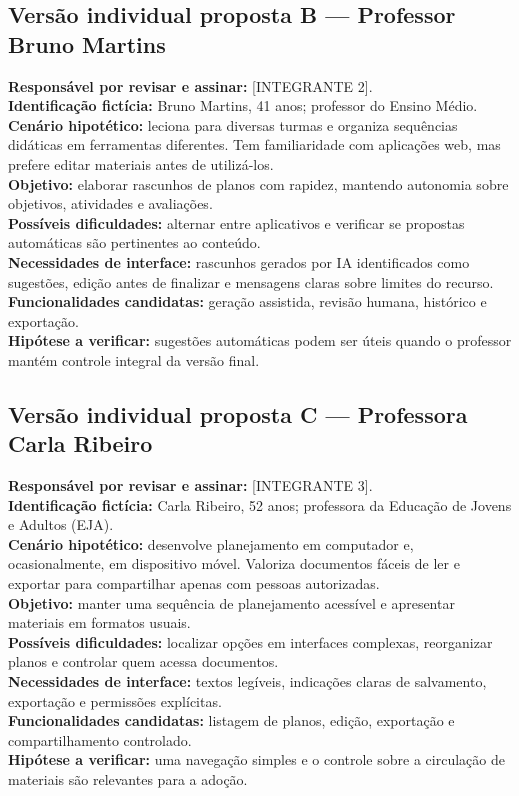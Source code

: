 \documentclass[12pt,a4paper,oneside]{report}
\begin{document}
\subsection{Versão individual proposta B --- Professor Bruno Martins}
\noindent\textbf{Responsável por revisar e assinar:} [INTEGRANTE 2].\\
\textbf{Identificação fictícia:} Bruno Martins, 41 anos; professor do Ensino Médio.\\
\textbf{Cenário hipotético:} leciona para diversas turmas e organiza sequências didáticas em ferramentas diferentes. Tem familiaridade com aplicações web, mas prefere editar materiais antes de utilizá-los.\\
\textbf{Objetivo:} elaborar rascunhos de planos com rapidez, mantendo autonomia sobre objetivos, atividades e avaliações.\\
\textbf{Possíveis dificuldades:} alternar entre aplicativos e verificar se propostas automáticas são pertinentes ao conteúdo.\\
\textbf{Necessidades de interface:} rascunhos gerados por IA identificados como sugestões, edição antes de finalizar e mensagens claras sobre limites do recurso.\\
\textbf{Funcionalidades candidatas:} geração assistida, revisão humana, histórico e exportação.\\
\textbf{Hipótese a verificar:} sugestões automáticas podem ser úteis quando o professor mantém controle integral da versão final.

\subsection{Versão individual proposta C --- Professora Carla Ribeiro}
\noindent\textbf{Responsável por revisar e assinar:} [INTEGRANTE 3].\\
\textbf{Identificação fictícia:} Carla Ribeiro, 52 anos; professora da Educação de Jovens e Adultos (EJA).\\
\textbf{Cenário hipotético:} desenvolve planejamento em computador e, ocasionalmente, em dispositivo móvel. Valoriza documentos fáceis de ler e exportar para compartilhar apenas com pessoas autorizadas.\\
\textbf{Objetivo:} manter uma sequência de planejamento acessível e apresentar materiais em formatos usuais.\\
\textbf{Possíveis dificuldades:} localizar opções em interfaces complexas, reorganizar planos e controlar quem acessa documentos.\\
\textbf{Necessidades de interface:} textos legíveis, indicações claras de salvamento, exportação e permissões explícitas.\\
\textbf{Funcionalidades candidatas:} listagem de planos, edição, exportação e compartilhamento controlado.\\
\textbf{Hipótese a verificar:} uma navegação simples e o controle sobre a circulação de materiais são relevantes para a adoção.
\end{document}

